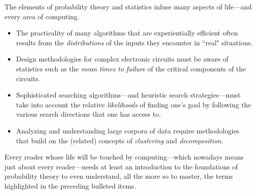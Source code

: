 The elements of probability theory and statistics infuse many aspects of life---and every area of computing.
\begin{itemize}
\item
The practicality of many algorithms that are experientially efficient often results from the {\em distributions} of the inputs they encounter in ``real" situations.
\item
Design methodologies for complex electronic circuits must be aware of statistics such as the {\em mean times to failure} of the critical components of the circuits.
\item
Sophisticated searching algorithms---and heuristic search strategies---must take into account the relative
{\em likelihoods} of finding one's goal by following the various search directions that one has access to.
\item
Analyzing and understanding large corpora of data require methodologies that build on the (related) concepts of {\em clustering} and {\em decomposition}.
\end{itemize}
Every reader whose life will be touched by computing---which nowadays means just about every reader---needs at least an introduction to the foundations of probability theory to even understand, all the more so to master, the terms highlighted in the preceding bulleted items.

\medskip


